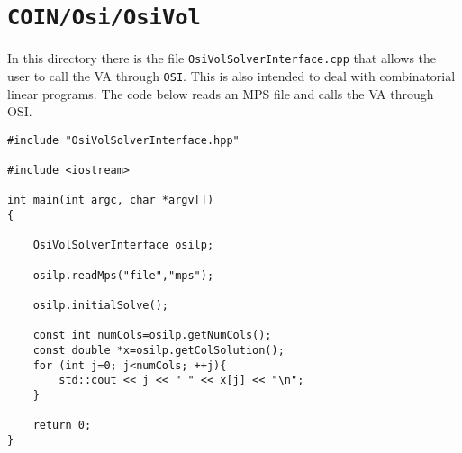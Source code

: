 \documentclass{article}
\begin{document}
\section{{\tt COIN/Osi/OsiVol}}

In this directory there is the file {\tt OsiVolSolverInterface.cpp}
that allows the user to call the VA through {\tt OSI}. This is also
intended to deal with combinatorial linear programs. The code below
reads an MPS file and calls the VA through OSI.

\begin{verbatim}
#include "OsiVolSolverInterface.hpp"

#include <iostream>

int main(int argc, char *argv[])
{
    
    OsiVolSolverInterface osilp;
    
    osilp.readMps("file","mps");
    
    osilp.initialSolve();

    const int numCols=osilp.getNumCols();
    const double *x=osilp.getColSolution();
    for (int j=0; j<numCols; ++j){
        std::cout << j << " " << x[j] << "\n";
    }
   
    return 0;
}  
\end{verbatim}

%





\end{document}
